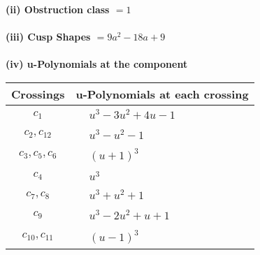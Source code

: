 \documentclass[1p]{elsarticle_modified}
\theoremstyle{definition}
\begin{document}
\flushleft \textbf{(ii) Obstruction class $= 1$}\\~\\
\flushleft \textbf{(iii) Cusp Shapes $= 9 a^2-18 a+9$}\\~\\
\newpage\renewcommand{\arraystretch}{1}
\flushleft \textbf{(iv) u-Polynomials at the component}\newline \\
\begin{tabular}{m{50pt}|m{274pt}}
Crossings & \hspace{64pt}u-Polynomials at each crossing \\
\hline $$\begin{aligned}c_{1}\end{aligned}$$&$\begin{aligned}
&u^3-3 u^2+4 u-1
\end{aligned}$\\
\hline $$\begin{aligned}c_{2},c_{12}\end{aligned}$$&$\begin{aligned}
&u^3- u^2-1
\end{aligned}$\\
\hline $$\begin{aligned}c_{3},c_{5},c_{6}\end{aligned}$$&$\begin{aligned}
&(u+1)^3
\end{aligned}$\\
\hline $$\begin{aligned}c_{4}\end{aligned}$$&$\begin{aligned}
&u^3
\end{aligned}$\\
\hline $$\begin{aligned}c_{7},c_{8}\end{aligned}$$&$\begin{aligned}
&u^3+u^2+1
\end{aligned}$\\
\hline $$\begin{aligned}c_{9}\end{aligned}$$&$\begin{aligned}
&u^3-2 u^2+u+1
\end{aligned}$\\
\hline $$\begin{aligned}c_{10},c_{11}\end{aligned}$$&$\begin{aligned}
&(u-1)^3
\end{aligned}$\\
\hline
\end{tabular}\\~\\
\end{document}
